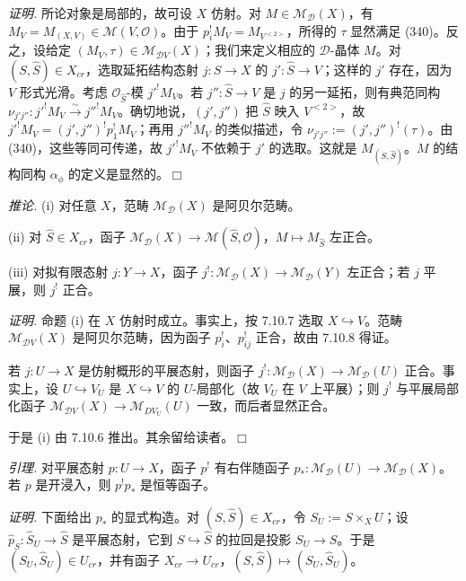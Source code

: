 \emph{证明.} 所论对象是局部的，故可设 $X$ 仿射。对 $M\in\mathcal{M}_{\mathcal{D}}(X)$，有 $M_{V}=M_{(X,V)}\in\mathcal{M}(V,\mathcal{O})$。由于 $p^{!}_{i}M_{V}=M_{V^{<2>}}$，所得的 $\tau$ 显然满足 (340)。反之，设给定 $(M_{V},\tau)\in\mathcal{M}_{\mathcal{D}V}(X)$；我们来定义相应的 $\mathcal{D}$-晶体 $M$。对 $(S,\hat S)\in X_{cr}$，选取延拓结构态射 $j:S\to X$ 的 $j':\hat S\to V$；这样的 $j'$ 存在，因为 $V$ 形式光滑。考虑 $\mathcal{O}_{\hat S}$-模 $j'^{!}M_{V}$。若 $j'':\hat S\to V$ 是 $j$ 的另一延拓，则有典范同构 $\nu_{j'j''}:j'^{!}M_{V}\xrightarrow{\sim}j''^{!}M_{V}$。确切地说，$(j',j'')$ 把 $\hat S$ 映入 $V^{<2>}$，故 $j'^{!}M_{V}=(j',j'')^{!}p^{!}_{1}M_{V}$；再用 $j''^{!}M_{V}$ 的类似描述，令 $\nu_{j'j''}:=(j',j'')^{!}(\tau)$。由 (340)，这些等同可传递，故 $j'^{!}M_{V}$ 不依赖于 $j'$ 的选取。这就是 $M_{(S,\hat S)}$。$M$ 的结构同构 $\alpha_{\phi}$ 的定义是显然的。\hfill$\Box$

 \emph{推论.} (i) 对任意 $X$，范畴 $\mathcal{M}_{\mathcal{D}}(X)$ 是阿贝尔范畴。

(ii) 对 $\hat S\in X_{cr}$，函子 $\mathcal{M}_{\mathcal{D}}(X)\to\mathcal{M}(\hat S,\mathcal{O})$，$M\mapsto M_{\hat S}$ 左正合。

(iii) 对拟有限态射 $j:Y\to X$，函子 $j^{!}:\mathcal{M}_{\mathcal{D}}(X)\to\mathcal{M}_{\mathcal{D}}(Y)$ 左正合；若 $j$ 平展，则 $j^{!}$ 正合。

\emph{证明.} 命题 (i) 在 $X$ 仿射时成立。事实上，按 7.10.7 选取 $X\hookrightarrow V$。范畴 $\mathcal{M}_{\mathcal{D}V}(X)$ 是阿贝尔范畴，因为函子 $p^{!}_{i}$、$p^{!}_{ij}$ 正合，故由 7.10.8 得证。


若 $j:U\to X$ 是仿射概形的平展态射，则函子 $j^{!}:\mathcal{M}_{\mathcal{D}}(X)\to\mathcal{M}_{\mathcal{D}}(U)$ 正合。事实上，设 $U\hookrightarrow V_{U}$ 是 $X\hookrightarrow V$ 的 $U$-局部化（故 $V_{U}$ 在 $V$ 上平展）；则 $j^{!}$ 与平展局部化函子 $\mathcal{M}_{\mathcal{D}V}(X)\to\mathcal{M}_{DV_{U}}(U)$ 一致，而后者显然正合。

于是 (i) 由 7.10.6 推出。其余留给读者。\hfill$\Box$

 \emph{引理.} 对平展态射 $p:U\to X$，函子 $p^{!}$ 有右伴随函子 $p_{*}:\mathcal{M}_{\mathcal{D}}(U)\to\mathcal{M}_{\mathcal{D}}(X)$。若 $p$ 是开浸入，则 $p^{!}p_{*}$ 是恒等函子。

\emph{证明.} 下面给出 $p_{*}$ 的显式构造。对 $(S,\hat S)\in X_{cr}$，令 $S_{U}:=S\times_{X}U$；设 $\hat p_{S}:\hat S_{U}\to\hat S$ 是平展态射，它到 $S\hookrightarrow\hat S$ 的拉回是投影 $S_{U}\to S$。于是 $(S_{U},\hat S_{U})\in U_{cr}$，并有函子 $X_{cr}\to U_{cr}$，$(S,\hat S)\mapsto(S_{U},\hat S_{U})$。


